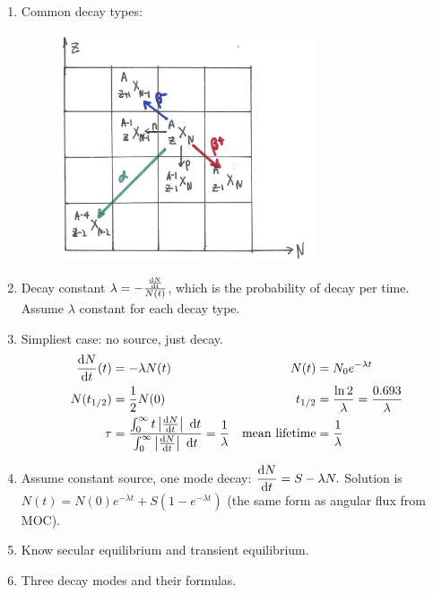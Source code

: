 \documentclass{school-22.101-notes}
\begin{document}
\clearpage
\begin{enumerate}
\item Common decay types:
    \begin{figure}[h!]
        \centering
        \includegraphics[width=3in]{images/rd/Z-N-grid.png}
    \end{figure}

\item Decay constant $\lambda = -\frac{\frac{\mathrm{d}N}{\mathrm{d}t}}{N(t)}$, which is the probability of decay per time. Assume $\lambda$ constant for each decay type. 

\item Simpliest case: no source, just decay. 
    \begin{align}
    \frac{\mathrm{d}N}{\mathrm{d}t} (t) &= - \lambda N(t) &  N(t) &= N_0 e^{-\lambda  t} \\
    N(t_{1/2}) &= \frac{1}{2} N(0) & t_{1/2} &= \frac{\ln 2}{\lambda} = \frac{0.693}{\lambda} \\
    \tau &= \frac{\int_0^{\infty} t \left| \frac{\mathrm{d}N}{\mathrm{d}t} \right| \mbox{ }\mathrm{d} t }{\int_0^{\infty}  \left| \frac{\mathrm{d}N}{\mathrm{d}t} \right| \mbox{ }\mathrm{d} t} = \frac{1}{\lambda} & \mbox{mean lifetime} &= \frac{1}{\lambda}
    \end{align}

\item Assume constant source, one mode decay: $\displaystyle \frac{\mathrm{d}N}{\mathrm{d}t} = S - \lambda N.$ Solution is $N(t) = N(0) e^{-\lambda t} + S(1 - e^{-\lambda t})$ (the same form as angular flux from MOC). 

\item Know secular equilibrium and transient equilibrium. 

\item Three decay modes and their formulas. 


\end{enumerate}
\end{document}
